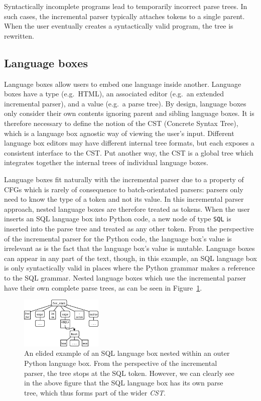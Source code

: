 \documentclass[sigplan,screen]{acmart}\settopmatter{printfolios=true,printccs=false,printacmref=false}
\newcommand{\inputtree}[0]{\emph{CST}\xspace}
\begin{document}
Syntactically incomplete programs lead to temporarily incorrect parse trees.
In such cases, the incremental parser typically attaches tokens to a single
parent. When the user eventually creates a syntactically valid program, the
tree is rewritten.

\subsection{Language boxes}

Language boxes allow users to embed one language inside another.  Language
boxes have a type (e.g.~HTML), an associated editor (e.g.~an extended
incremental parser), and a value (e.g.~a parse tree).  By design, language
boxes only consider their own contents ignoring parent and sibling language
boxes. It is therefore necessary to define the notion of the CST (Concrete
Syntax Tree), which is a language box agnostic way of viewing the user's input.
Different language box editors may have different internal tree formats, but
each exposes a consistent interface to the CST.  Put another way, the CST is a
global tree which integrates together the internal trees of individual language
boxes.

Language boxes fit naturally with the incremental parser due to a property of
CFGs which is rarely of consequence to batch-orientated parsers: parsers only
need to know the type of a token and not its value. In this incremental parser
approach, nested language boxes are therefore treated as tokens. When the user
inserts an SQL language box into Python code, a new node of type \texttt{SQL}
is inserted into the parse tree and treated as any other token. From the
perspective of the incremental parser for the Python code, the language box's
value is irrelevant as is the fact that the language box's value is mutable.
Language boxes can appear in any part of the text, though, in this example, an
SQL language box is only syntactically valid in places where the Python grammar
makes a reference to the SQL grammar. Nested language boxes which use the
incremental parser have their own complete parse trees, as can be seen in
Figure~\ref{fig:lboxtree}.

\begin{figure}[t]
\begin{center}
\includegraphics[width=0.35\textwidth]{images/lboxtree}
\caption{An elided example of an SQL language box nested within an outer Python
language box. From the perspective of the incremental parser, the tree stops
at the SQL token. However, we can
clearly see in the above figure that the SQL language box has its own parse
tree, which thus forms part of the wider \inputtree.}
\label{fig:lboxtree}
\end{center}
\end{figure}
\end{document}

